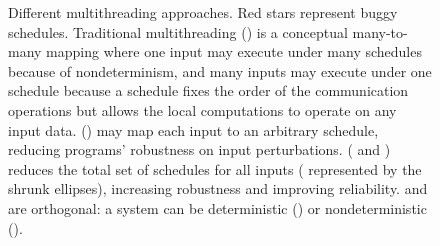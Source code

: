 \begin{figure}[t]
\begin{center}
\vspace{-.05in}
\caption{Different multithreading approaches. Red stars represent buggy
  schedules.  Traditional multithreading ()
  is a conceptual many-to-many mapping where one input may execute under
  many schedules because of nondeterminism, and many inputs may execute
  under one schedule because a schedule fixes the order of the
  communication operations but allows the local computations to operate on
  any input data.  \dmt () may
  map each input to an arbitrary schedule, reducing programs' robustness
  on input perturbations.  \smt ( and
  ) reduces the total set of schedules for all inputs (
represented by the shrunk ellipses),
  increasing robustness and improving reliability.
  \smt and \dmt are orthogonal: a \smt system can be deterministic
  () or nondeterministic ().}
\vspace{-.2in}
\end{center}
\end{figure}

